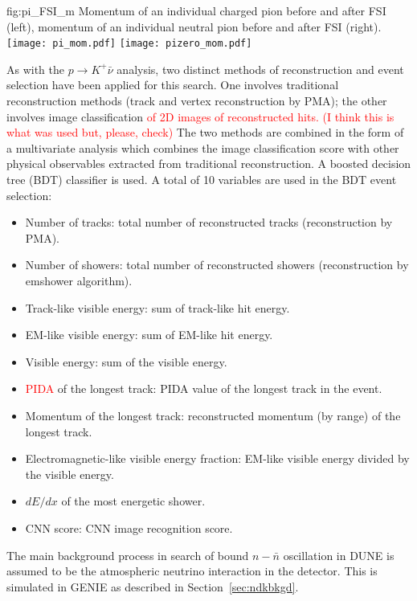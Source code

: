\begin{dunefigure}
{fig:pi_FSI_m}
{Momentum of an individual charged pion before and after FSI (left), momentum of an individual neutral pion before and after FSI (right).}
\texttt{[image: pi\_mom.pdf]}
\texttt{[image: pizero\_mom.pdf]}
\end{dunefigure} 

As with the $p\rightarrow K^{+} \bar{\nu}$ analysis, two distinct methods of reconstruction and event selection have been applied for this search. One involves traditional reconstruction methods (\threed track and vertex reconstruction by PMA); the other involves image classification 
\textcolor{red}{of 2D images of reconstructed hits. (I think this is what was used but, please, check)} The two methods are combined in the form of a multivariate analysis which combines the image classification score with other physical observables extracted from traditional reconstruction.  A boosted decision tree (BDT) classifier is used. A total of 10 variables are used in the BDT event selection:
 \begin{itemize}
  \item Number of tracks: total number of reconstructed tracks (reconstruction by PMA).
  \item Number of showers: total number of reconstructed showers (reconstruction by emshower algorithm). 
  \item Track-like visible energy: sum of track-like hit energy.
  \item EM-like visible energy: sum of EM-like hit energy.
  \item Visible energy: sum of the visible energy.
  \item \textcolor{red}{PIDA} of the longest track: PIDA value of the longest track in the event.
  \item Momentum of the longest track: reconstructed momentum (by range) of the longest track.
  \item Electromagnetic-like visible energy fraction: EM-like visible energy divided by the visible energy.
  \item $dE/dx$ of the most energetic shower. 
  \item CNN score: CNN image recognition score.
 \end{itemize}

The main background process in search of bound $n-\bar{n}$ oscillation in DUNE is assumed to be the atmospheric neutrino interaction in the detector.  This is simulated in GENIE as described in Section~\ref{sec:ndkbkgd}.

